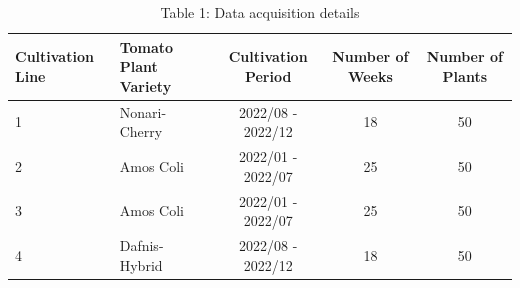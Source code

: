 \begin{table}[ht]
\centering
\caption{Table 1: Data acquisition details}
\begin{tabular}{llccc}
\hline
Cultivation Line & Tomato Plant Variety & Cultivation Period & Number of Weeks & Number of Plants \\
\hline
1 & Nonari-Cherry & 2022/08 - 2022/12 & 18 & 50 \\
2 & Amos Coli & 2022/01 - 2022/07 & 25 & 50 \\
3 & Amos Coli & 2022/01 - 2022/07 & 25 & 50 \\
4 & Dafnis-Hybrid & 2022/08 - 2022/12 & 18 & 50 \\
\hline
\end{tabular}
\end{table}
